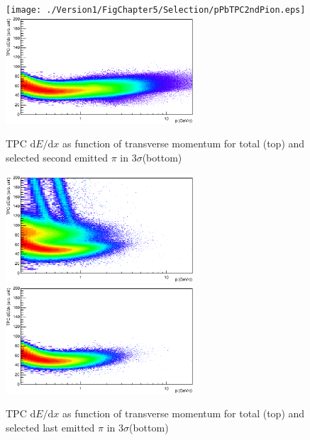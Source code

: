  
 \begin{figure}[htbp]
\begin{center}
\texttt{[image: ./Version1/FigChapter5/Selection/pPbTPC2ndPion.eps]}
\hspace{0.5cm}
\includegraphics[width=7.0cm]{./Version1/FigChapter5/Selection/pPbTPC2ndPionAfter.eps}
\label{fig:pPb:TPCpionSecondEmitted} 
\caption{ TPC $\mathrm{d}E/\mathrm{d}x$ as function of transverse momentum for total (top) and selected second emitted $\pi$ in 3$\sigma$(bottom) }
\end{center}
\end{figure}


\begin{figure}[htbp]
\begin{center}
\includegraphics[width=7.0cm]{./Version1/FigChapter5/Selection/pPbTPC1stPion.eps}
\hspace{0.5cm}
\includegraphics[width=7.0cm]{./Version1/FigChapter5/Selection/pPbTPC1stPionAfter.eps}
\label{fig:pPb:TPCpionLastEmitted} 
\caption{ TPC $\mathrm{d}E/\mathrm{d}x$ as function of transverse momentum for total (top) and selected last emitted $\pi$ in 3$\sigma$(bottom) }
\end{center}
\end{figure}


